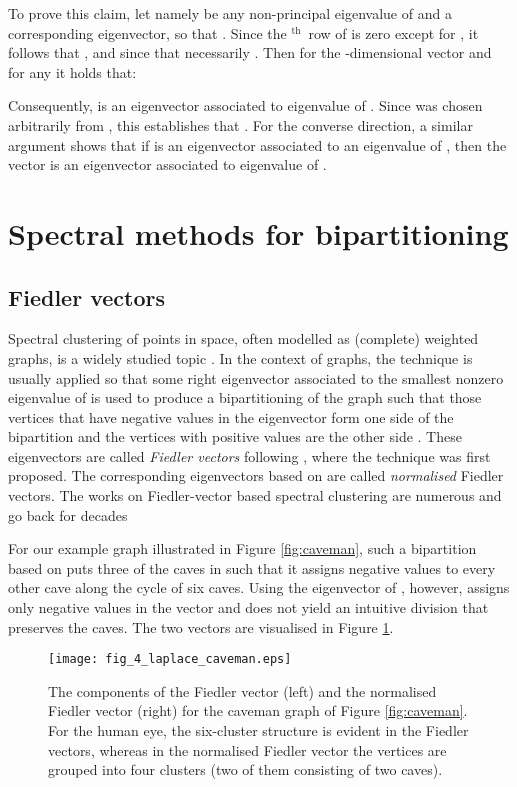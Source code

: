 \documentclass{article}
\newcommand{\superscript}[1]{\ensuremath{^\textrm{#1}}}
\renewcommand{\th}{\superscript{th}}
\begin{document}
To prove this claim, let namely  be any non-principal
eigenvalue of  and  a corresponding eigenvector, so that
.  Since the \th\ row of  is zero
except for , it follows that , and since  that necessarily . Then for the -dimensional vector  and for any  it holds that:

Consequently,  is an eigenvector associated to
eigenvalue  of . Since  was chosen
arbitrarily from , this
establishes that .
For the converse direction, a similar argument shows that if
 is an eigenvector associated
to an eigenvalue  of , then the vector
 is an
eigenvector associated to eigenvalue  of .

\section{Spectral methods for bipartitioning}

\subsection{Fiedler vectors}

Spectral clustering of points in space, often modelled as (complete)
weighted graphs, is a widely studied topic \cite{HKK07, KVV04}. In the
context of graphs, the technique is usually applied so that some right
eigenvector associated to the smallest nonzero eigenvalue
 of  is used to produce a bipartitioning of the
graph such that those vertices that have negative values in the
eigenvector form one side of the bipartition  and the vertices with
positive values are the other side .  These
eigenvectors are called \emph{Fiedler vectors} following
\cite{Fied73,Fied75}, where the technique was first proposed.  The
corresponding eigenvectors based on  are called \emph{normalised}
Fiedler vectors. The works on Fiedler-vector based spectral clustering
are numerous and go back for decades \cite{SpTe96,QiHa06,HoSu99}

For our example graph illustrated in Figure \ref{fig:caveman}, such a
bipartition based on  puts three of the caves in  such that it
assigns negative values to every other cave along the cycle of six
caves. Using the eigenvector of , however, assigns only negative
values in the vector and does not yield an intuitive division that
preserves the caves. The two vectors are visualised in Figure
\ref{fig:laplace}.

\begin{figure}
\centerline{\texttt{[image: fig\_4\_laplace\_caveman.eps]}}
\caption{The components of the Fiedler vector (left) and the
  normalised Fiedler vector (right) for the caveman graph of Figure
  \ref{fig:caveman}. For the human eye, the six-cluster structure is
  evident in the Fiedler vectors, whereas in the normalised Fiedler vector
  the vertices are grouped into four clusters (two of them consisting
  of two caves).}
\label{fig:laplace}
\end{figure}
\end{document}
